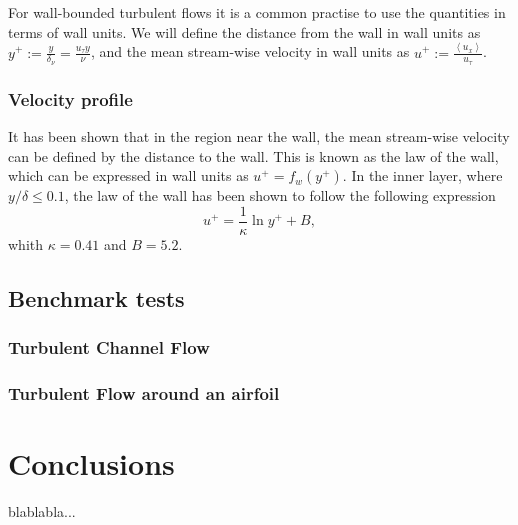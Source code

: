 For wall-bounded turbulent flows it is a common practise to use the quantities in terms of wall units. We will define the distance from the wall in wall units as $ y^+:=\frac{y}{\delta_\nu}=\frac{u_\tau y}{\nu} $, and the mean stream-wise velocity in wall units as $ u^+:=\frac{\left\langle u_x\right\rangle}{u_\tau} $.

\subsubsection{Velocity profile}
It has been shown that in the region near the wall, the mean stream-wise velocity can be defined by the distance to the wall. This is known as the law of the wall, which can be expressed in wall units as $ u^+=f_w(y^+) $. In the inner layer, where $ y/\delta\le0.1 $, the law of the wall has been shown to follow the following expression
\begin{equation}
\label{eq-wall_law}
u^+=\frac{1}{\kappa}\ln y^++B,
\end{equation}
whith $ \kappa=0.41 $ and $ B=5.2 $.

\subsection{Benchmark tests}
\subsubsection{Turbulent Channel Flow}
\subsubsection{Turbulent Flow around an airfoil}

\section{Conclusions}
\label{sec-C3_conclusions}

blablabla...
